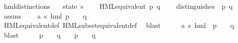 \begin{isabellebody}
\ hml{\isacharunderscore}{\kern0pt}distinctions{\isacharcolon}{\kern0pt}\isanewline
\ \ \ state{\isacharcolon}{\kern0pt}{\isacharcolon}{\kern0pt}\ {\isacharprime}{\kern0pt}s\isanewline
\ \ \ {\isacartoucheopen}{\isasymnot}\ HML{\isacharunderscore}{\kern0pt}equivalent\ p\ q{\isacartoucheclose}\isanewline
\ \ \ {\isacartoucheopen}{\isasymexists}{\isasymphi}{\isachardot}{\kern0pt}\ distinguishes\ {\isasymphi}\ p\ q{\isacartoucheclose}\isanewline
%
\isadelimproof
%
\endisadelimproof
%
\isatagproof
{}\isamarkupfalse%
{\isacharminus}{\kern0pt}\isanewline
\ \ \isamarkupfalse%
\ assms\ \isamarkupfalse%
\ {\isachardoublequoteopen}{\isasymnot}\ {\isacharparenleft}{\kern0pt}{\isasymforall}\ {\isasymphi}{\isacharcolon}{\kern0pt}{\isacharcolon}{\kern0pt}{\isacharparenleft}{\kern0pt}{\isacharprime}{\kern0pt}a{\isacharcomma}{\kern0pt}\ {\isacharprime}{\kern0pt}s{\isacharparenright}{\kern0pt}\ hml{\isachardot}{\kern0pt}\ {\isacharparenleft}{\kern0pt}p\ {\isasymTurnstile}\ {\isasymphi}{\isacharparenright}{\kern0pt}\ {\isasymlongleftrightarrow}\ {\isacharparenleft}{\kern0pt}q\ {\isasymTurnstile}\ {\isasymphi}{\isacharparenright}{\kern0pt}{\isacharparenright}{\kern0pt}{\isachardoublequoteclose}\ \isanewline
\ \ \ \ \isamarkupfalse%
\ HML{\isacharunderscore}{\kern0pt}equivalent{\isacharunderscore}{\kern0pt}def\ HML{\isacharunderscore}{\kern0pt}subset{\isacharunderscore}{\kern0pt}equivalent{\isacharunderscore}{\kern0pt}def\ \isamarkupfalse%
\ blast\isanewline
\ \ \isamarkupfalse%
\ \isamarkupfalse%
\ {\isasymphi}{\isacharcolon}{\kern0pt}{\isacharcolon}{\kern0pt}{\isachardoublequoteopen}{\isacharparenleft}{\kern0pt}{\isacharprime}{\kern0pt}a{\isacharcomma}{\kern0pt}\ {\isacharprime}{\kern0pt}s{\isacharparenright}{\kern0pt}\ hml{\isachardoublequoteclose}\ \ {\isachardoublequoteopen}{\isacharparenleft}{\kern0pt}p\ {\isasymTurnstile}\ {\isasymphi}{\isacharparenright}{\kern0pt}\ {\isasymnoteq}\ {\isacharparenleft}{\kern0pt}q\ {\isasymTurnstile}\ {\isasymphi}{\isacharparenright}{\kern0pt}{\isachardoublequoteclose}\ \isamarkupfalse%
\ blast\isanewline
\ \ \isamarkupfalse%
\ \isamarkupfalse%
\ {\isachardoublequoteopen}{\isacharparenleft}{\kern0pt}{\isacharparenleft}{\kern0pt}p\ {\isasymTurnstile}\ {\isasymphi}{\isacharparenright}{\kern0pt}\ {\isasymand}\ {\isasymnot}{\isacharparenleft}{\kern0pt}q\ {\isasymTurnstile}\ {\isasymphi}{\isacharparenright}{\kern0pt}{\isacharparenright}{\kern0pt}\ {\isasymor}\ {\isacharparenleft}{\kern0pt}{\isasymnot}{\isacharparenleft}{\kern0pt}p\ {\isasymTurnstile}\ {\isasymphi}{\isacharparenright}{\kern0pt}\ {\isasymand}\ {\isacharparenleft}{\kern0pt}q\ {\isasymTurnstile}\ {\isasymphi}{\isacharparenright}{\kern0pt}{\isacharparenright}{\kern0pt}{\isachardoublequoteclose}\isanewline

\end{isabellebody}
